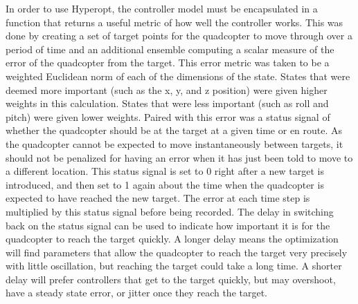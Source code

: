 \documentclass[letterpaper,12pt,titlepage,oneside,final]{book}
\begin{document}
In order to use Hyperopt, the controller model must be encapsulated in a function that returns a useful metric of how well the controller works.
This was done by creating a set of target points for the quadcopter to move through over a period of time and an additional ensemble computing a scalar measure of the error of the quadcopter from the target. 
This error metric was taken to be a weighted Euclidean norm of each of the dimensions of the state.
States that were deemed more important (such as the x, y, and z position) were given higher weights in this calculation.
States that were less important (such as roll and pitch) were given lower weights. 
Paired with this error was a status signal of whether the quadcopter should be at the target at a given time or en route.
As the quadcopter cannot be expected to move instantaneously between targets, it should not be penalized for having an error when it has just been told to move to a different location. 
This status signal is set to 0 right after a new target is introduced, and then set to 1 again about the time when the quadcopter is expected to have reached the new target. The error at each time step is multiplied by this status signal before being recorded. 
The delay in switching back on the status signal can be used to indicate how important it is for the quadcopter to reach the target quickly. 
A longer delay means the optimization will find parameters that allow the quadcopter to reach the target very precisely with little oscillation, but reaching the target could take a long time. 
A shorter delay will prefer controllers that get to the target quickly, but may overshoot, have a steady state error, or jitter once they reach the target.
\end{document}
